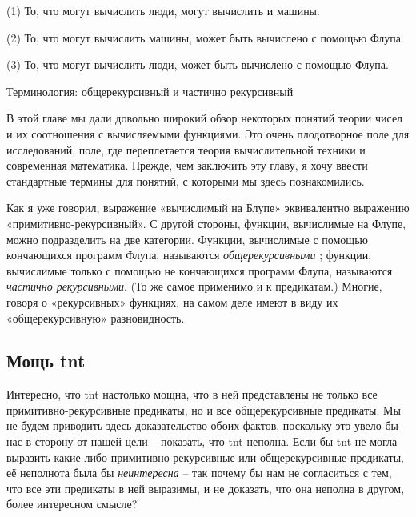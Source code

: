 \documentclass[../main.tex]{subfiles}
\begin{document}
(1) То, что могут вычислить люди, могут вычислить и машины.

(2) То, что могут вычислить машины, может быть вычислено с помощью Флупа.

(3) То, что могут вычислить люди, может быть вычислено с помощью Флупа.

Терминология: общерекурсивный и частично рекурсивный

В этой главе мы дали довольно широкий обзор некоторых понятий теории чисел и их соотношения с вычисляемыми функциями. Это очень плодотворное поле для исследований, поле, где переплетается теория вычислительной техники и современная математика. Прежде, чем заключить эту главу, я хочу ввести стандартные термины для понятий, с которыми мы здесь познакомились.

Как я уже говорил, выражение «вычислимый на Блупе» эквивалентно выражению «примитивно-рекурсивный». С другой стороны, функции, вычислимые на Флупе, можно подразделить на две категории. Функции, вычислимые с помощью кончающихся программ Флупа, называются \emph{общерекурсивными} ; функции, вычислимые только с помощью не кончающихся программ Флупа, называются \emph{частично рекурсивными}. (То же самое применимо и к предикатам.) Многие, говоря о «рекурсивных» функциях, на самом деле имеют в виду их «общерекурсивную» разновидность.


\subsection{Мощь \acs{tnt}}

Интересно, что \acs{tnt} настолько мощна, что в ней представлены не только все примитивно-рекурсивные предикаты, но и все общерекурсивные предикаты. Мы не будем приводить здесь доказательство обоих фактов, поскольку это увело бы нас в сторону от нашей цели \--- показать, что \acs{tnt} неполна. Если бы \acs{tnt} не могла выразить какие-либо примитивно-рекурсивные или общерекурсивные предикаты, её неполнота была бы \emph{неинтересна} \--- так почему бы нам не согласиться с тем, что все эти предикаты в ней выразимы, и не доказать, что она неполна в другом, более интересном смысле?
\end{document}
